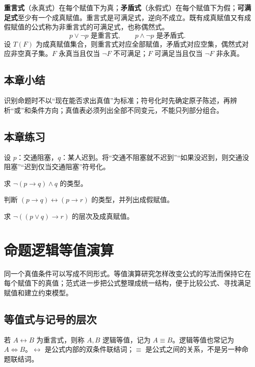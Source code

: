 \documentclass[UTF8,fontset=none,zihao=-4,a4paper]{ctexart}
\newcommand{\chapterpage}[1]{\clearpage\section{#1}}
\newcommand{\exercise}{\subsection{本章练习}}
\newcommand{\term}[1]{\textbf{#1}}
\begin{document}
\term{重言式}（永真式）在每个赋值下为真；\term{矛盾式}（永假式）在每个赋值下为假；\term{可满足式}至少有一个成真赋值。重言式是可满足式，逆向不成立。既有成真赋值又有成假赋值的公式称为非重言式的可满足式，也称偶然式。
\[
p\lor\neg p\text{ 是重言式},\qquad
p\land\neg p\text{ 是矛盾式}.
\]
设 $T(F)$ 为成真赋值集合，则重言式对应全部赋值，矛盾式对应空集，偶然式对应非空真子集。$F$ 永真当且仅当 $\neg F$ 不可满足；$F$ 可满足当且仅当 $\neg F$ 非永真。

\subsection{本章小结}
识别命题时不以“现在能否求出真值”为标准；符号化时先确定原子陈述，再辨析“或”和条件方向；真值表必须列出全部不同变元，不能只列部分组合。

\exercise
\begin{enumerate}[label=1.\arabic*.,leftmargin=2.8em]
\begin{samepage}
\item  设 $p$：交通阻塞，$q$：某人迟到。将“交通不阻塞就不迟到”“如果没迟到，则交通没阻塞”“迟到仅当交通阻塞”符号化。
\end{samepage}

\begin{samepage}
\item  求 $\neg(p\to q)\land q$ 的类型。
\end{samepage}

\begin{samepage}
\item  判断 $(p\to q)\leftrightarrow(p\to r)$ 的类型，并列出成假赋值。
\end{samepage}

\begin{samepage}
\item  求 $\neg((p\lor q)\to r)$ 的层次及成真赋值。
\end{samepage}
\end{enumerate}


\chapterpage{命题逻辑等值演算}

同一个真值条件可以写成不同形式。等值演算研究怎样改变公式的写法而保持它在每个赋值下的真值；范式进一步把公式整理成统一结构，便于比较公式、寻找满足赋值和建立约束模型。
\subsection{等值式与记号的层次}
若 $A\leftrightarrow B$ 为重言式，则称 $A,B$ 逻辑等值，记为 $A\equiv B$。逻辑等值也常记为 $A\Leftrightarrow B$。$\leftrightarrow$ 是公式内部的双条件联结词；$\equiv$ 是公式之间的关系，不是另一种命题联结词。
\end{document}
